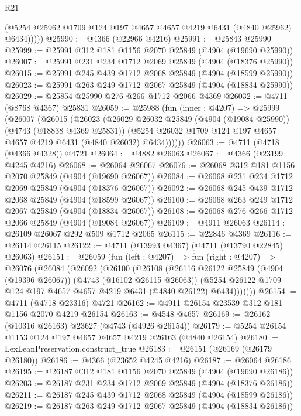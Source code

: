 \begin{lexlean}{R21}
\begin{coremodule}
            (@5254 @25962 @1709 @124 @197 @4657 @4657 @4219 @6431 (@4840 @25962) @6434)))))
@25990 := @4366 (@22966 @4216)
@25991 := @25843 @25990
@25999 := @25991 @312 @181 @1156 @2070 @25849 (@4904 (@19690 @25990))
@26007 := @25991 @231 @234 @1712 @2069 @25849 (@4904 (@18376 @25990))
@26015 := @25991 @245 @439 @1712 @2068 @25849 (@4904 (@18599 @25990))
@26023 := @25991 @263 @249 @1712 @2067 @25849 (@4904 (@18834 @25990))
@26029 := @25854 @25990 @276 @266 @1712 @2066 @4369
@26032 := @4711 (@8768 @4367) @25831
@26059 := @25988
    (fun (inner : @4207) =>
    @25999
      (@26007
        (@26015
          (@26023
            (@26029
              @26032
              @25849
              (@4904 (@19084 @25990))
              (@4743 (@18838 @4369 @25831))
              (@5254 @26032 @1709 @124 @197 @4657 @4657 @4219 @6431 (@4840 @26032) @6434))))))
@26063 := @4711 (@4718 (@4366 @4328)) @4721
@26064 := @4882 @26063
@26067 := @4366 (@23199 @4245 @4216)
@26068 := @26064 @26067
@26076 := @26068 @312 @181 @1156 @2070 @25849 (@4904 (@19690 @26067))
@26084 := @26068 @231 @234 @1712 @2069 @25849 (@4904 (@18376 @26067))
@26092 := @26068 @245 @439 @1712 @2068 @25849 (@4904 (@18599 @26067))
@26100 := @26068 @263 @249 @1712 @2067 @25849 (@4904 (@18834 @26067))
@26108 := @26068 @276 @266 @1712 @2066 @25849 (@4904 (@19084 @26067))
@26109 := @4911 @26063
@26114 := @26109 @26067 @292 @509 @1712 @2065
@26115 := @22846 @4369
@26116 := @26114 @26115
@26122 := @4711 (@13993 @4367) (@4711 (@13790 @22845) @26063)
@26151 := @26059
    (fun (left : @4207) =>
    fun (right : @4207) =>
    @26076
      (@26084
        (@26092
          (@26100
            (@26108
              (@26116
                @26122
                @25849
                (@4904 (@19396 @26067))
                (@4743 (@16102 @26115 @26063))
                (@5254 @26122 @1709 @124 @197 @4657 @4657 @4219 @6431 (@4840 @26122) @6434)))))))
@26154 := @4711 (@4718 @23316) @4721
@26162 := @4911 @26154 @23539 @312 @181 @1156 @2070 @4219 @26154
@26163 := @4548 @4657
@26169 := @26162 (@10316 @26163) @23627 (@4743 (@4926 @26154))
@26179 := @5254 @26154 @1153 @124 @197 @4657 @4657 @4219 @26163 (@4840 @26154)
@26180 := LexLeanPreservation.construct_true
@26183 := @26151 (@26169 (@26179 @26180))
@26186 := @4366 (@23652 @4245 @4216)
@26187 := @26064 @26186
@26195 := @26187 @312 @181 @1156 @2070 @25849 (@4904 (@19690 @26186))
@26203 := @26187 @231 @234 @1712 @2069 @25849 (@4904 (@18376 @26186))
@26211 := @26187 @245 @439 @1712 @2068 @25849 (@4904 (@18599 @26186))
@26219 := @26187 @263 @249 @1712 @2067 @25849 (@4904 (@18834 @26186))

\end{coremodule}
\end{lexlean}
